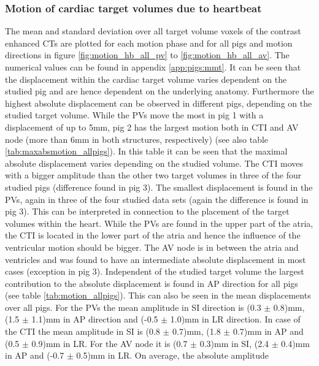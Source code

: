 

\subsubsection*{Motion of cardiac target volumes due to heartbeat}
\label{Sec:Motion_pigs}


The mean and standard deviation over all target volume voxels of the contrast enhanced CTs are plotted for each motion phase and for all pigs 
and motion directions in figure \ref{fig:motion_hb_all_pv} to \ref{fig:motion_hb_all_av}. The numerical values can be found 
in appendix \ref{app:pigs:mmt}. It can be seen that the displacement within the cardiac target volume varies dependent on the studied pig and 
are hence dependent on the underlying anatomy. Furthermore the highest absolute displacement can be observed in different pigs, depending on 
the studied target volume. While the PVs move the most in pig 1 with a displacement of up to 5mm, pig 2 has the 
largest motion both in CTI and AV node (more than 6mm in both structures, respectively) (see also table \ref{tab:maxabsmotion_allpigs}). 
In this table it can be seen that the maximal absolute displacement varies depending on the studied volume. The  
CTI moves with a bigger amplitude than the other two target volumes in three of the four studied pigs (difference found in pig 3). 
The smallest displacement is found in the PVs, again in three of the four studied data sets (again the difference is found in pig 3). 
This can be interpreted in connection to the placement of the target volumes within the heart. While the PVs are found in the upper part of the 
atria, the CTI is located in the lower part of the atria and hence the influence of the ventricular motion should be bigger. The AV node is in between 
the atria and ventricles and was found to have an intermediate absolute displacement in most cases (exception in pig 3).
Independent of the studied target volume the largest contribution to the absolute displacement is found in AP direction for all pigs 
(see table \ref{tab:motion_allpigs}). This can also be seen in the mean displacements over all pigs. 
For the PVs the mean amplitude in SI direction is (0.3 $\pm$ 0.8)mm, (1.5 $\pm$ 1.1)mm in AP direction and (-0.5 $\pm$ 1.0)mm in LR 
direction. In case of the CTI the mean amplitude in SI is (0.8 $\pm$ 0.7)mm, (1.8 $\pm$ 0.7)mm in AP and (0.5 $\pm$ 0.9)mm in LR. For 
the AV node it is (0.7 $\pm$ 0.3)mm in SI, (2.4 $\pm$ 0.4)mm in AP and (-0.7  $\pm$ 0.5)mm in LR. On average, the absolute amplitude 
